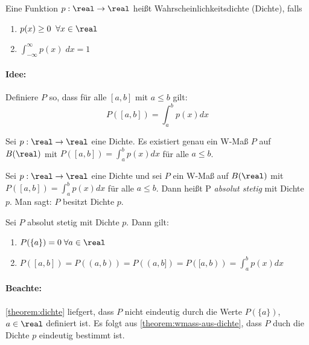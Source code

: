 \begin{definition}[Wahrscheinlichkeitsdichte]
    Eine Funktion $p: \real \to \real$ heißt Wahrscheinlichkeitsdichte (Dichte), falls
    \begin{enumerate}
        \item $p(x) \geq 0 \;\; \forall x\in \real$
        \item $\displaystyle\int_{-\infty}^\infty p(x)\; dx = 1$
    \end{enumerate}
\end{definition}

\paragraph{Idee:}
Definiere $P$ so, dass für alle $[a,b]$ mit $a \leq b$ gilt:
\begin{equation*}
    P([a,b]) = \int_a^b p(x) dx
\end{equation*}

\begin{theorem}
    \label{theorem:wmass-aus-dichte}
    Sei $p: \real \to \real$ eine Dichte.
    Es existiert genau ein W-Maß $P$ auf $B(\real)$ mit $P([a,b]) = \displaystyle\int_a^b p(x) dx$
    für alle $a \leq b$.
\end{theorem}

\begin{definition}
    Sei $p: \real \to \real$ eine Dichte und sei $P$ ein W-Maß auf $B(\real)$ mit
    $P([a,b]) = \displaystyle\int_a^b p(x) dx$ für alle $a \leq b$. Dann heißt P
    \emph{absolut stetig} mit Dichte $p$. Man sagt: $P$ besitzt Dichte $p$.
\end{definition}

\begin{theorem}
    \label{theorem:dichte}
    Sei $P$ absolut stetig mit Dichte $p$. Dann gilt:
    \begin{enumerate}
        \item $P(\{a\}) = 0 \; \forall a \in \real$
        \item $P([a,b]) = P((a,b)) = P((a,b]) = P([a,b)) = \displaystyle\int_a^b p(x) dx$
    \end{enumerate}
\end{theorem}

\paragraph{Beachte:}
\autoref{theorem:dichte} liefgert, dass $P$ nicht eindeutig durch die Werte $P(\{a\})$,
$a \in \real$ definiert ist.
Es folgt aus \autoref{theorem:wmass-aus-dichte}, dass $P$ duch die Dichte $p$
eindeutig bestimmt ist.\\

